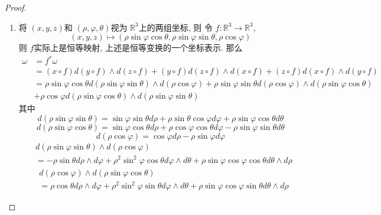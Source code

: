 \documentclass[../main.tex]{subfiles}
\begin{document}
\begin{proof}\begin{enumerate}
   
\item 将 \(  \left( x,y,z \right)   \)和 \(  \left( \rho , \varphi , \theta  \right)   \)视为 \(  \mathbb{R} ^{3}  \)上的两组坐标, 则   令 \(   f :\mathbb{R} ^{3}\to \mathbb{R} ^{3}  \), \[
 \left( x,y,z \right)\mapsto  \left( \rho \sin  \varphi \cos  \theta , \rho \sin  \varphi \sin  \theta ,\rho \cos  \varphi  \right)  
\]则 \(   f   \)实际上是恒等映射, 上述是恒等变换的一个坐标表示. 那么 \[
\begin{aligned}
 \omega &= f ^{*} \omega\\ 
   &= \left( x\circ f \right)d\left( y\circ f \right)\wedge d\left( z\circ f \right)+ \left( y\circ f \right) d\left( z\circ f \right)\wedge d\left( x\circ f \right)+ \left( z\circ f \right)      d\left( x\circ f \right)\wedge d\left( y\circ f \right)\\ 
    &= \rho \sin  \varphi \cos  \theta d\left( \rho \sin  \varphi \sin  \theta  \right)\wedge d\left( \rho \cos  \varphi  \right)+ \rho \sin  \varphi \sin  \theta d\left( \rho \cos  \varphi  \right)\wedge d\left( \rho \sin  \varphi \cos  \theta  \right)\\ 
     &+ \rho \cos  \varphi d\left( \rho \sin  \varphi \cos  \theta  \right)\wedge d\left( \rho \sin  \varphi \sin  \theta  \right)  
\end{aligned}
\] 其中 \[
d\left( \rho \sin  \varphi \sin  \theta  \right)= \sin  \varphi \sin  \theta d\rho + \rho \sin  \theta \cos  \varphi d \varphi + \rho \sin  \varphi \cos  \theta d \theta  
\]\[
d\left( \rho \sin  \varphi \cos  \theta  \right)=  \sin  \varphi \cos  \theta d\rho + \rho \cos  \varphi \cos  \theta d \varphi -\rho \sin  \varphi \sin  \theta d \theta 
\] \[
d\left( \rho \cos  \varphi  \right)= \cos  \varphi d\rho -\rho \sin  \varphi d \varphi  
\] \[
\begin{aligned}
&d\left( \rho \sin  \varphi \sin  \theta  \right)\wedge d\left( \rho \cos  \varphi  \right)\\ 
 &= -\rho \sin  \theta d\rho \wedge d \varphi + \rho ^{2}\sin ^{2} \varphi \cos  \theta d \varphi \wedge d \theta    + \rho \sin  \varphi \cos  \varphi \cos  \theta d \theta \wedge d\rho 
\end{aligned}
\] \[
\begin{aligned}
&d\left( \rho \cos  \varphi  \right)\wedge d\left( \rho \sin  \varphi \cos  \theta  \right)\\ 
 &= \rho \cos  \theta d\rho \wedge d \varphi + \rho ^{2}\sin ^{2} \varphi \sin  \theta d \varphi \wedge d \theta  + \rho \sin  \varphi \cos  \varphi \sin  \theta d \theta \wedge d\rho  

\end{aligned}\]
\end{enumerate}
\end{proof}
\end{document}
